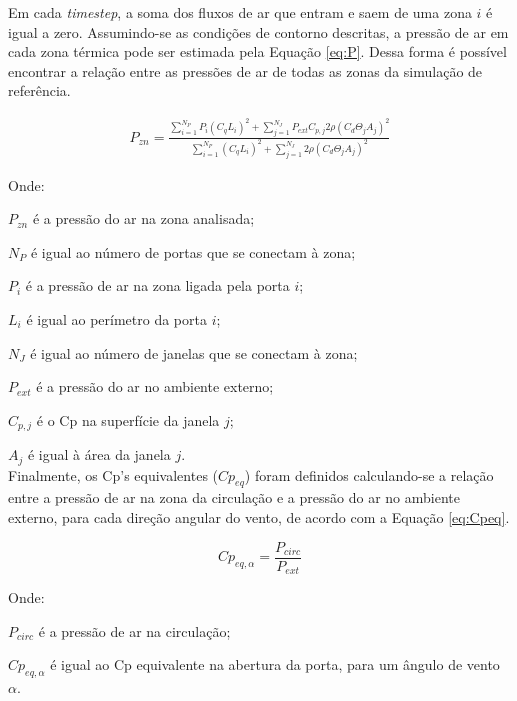 \documentclass[brazil,hardcopy,openany,a5paper]{ufscthesis}
\begin{document}
		Em cada \textit{timestep}, a soma dos fluxos de ar que entram e saem de uma zona $i$ é igual a zero. Assumindo-se as condições de contorno descritas, a pressão de ar em cada zona térmica pode ser estimada pela Equação \ref{eq:P}. Dessa forma é possível encontrar a relação entre as pressões de ar de todas as zonas da simulação de referência.
		
		\begin{equation}\label{eq:P}
		\begin{split}
		P_{zn} = \frac{\sum_{i=1}^{N_P}{P_{i} (C_q L_i)^2} +  %
		\sum_{j=1}^{N_J}{P_{ext} C_{p,j} 2 \rho (C_{d} \Theta_j A_j)^2 }}
		{\sum_{i=1}^{N_P}{(C_q L_i)^2} +  %
			\sum_{j=1}^{N_J}{2 \rho (C_{d} \Theta_j A_j)^2 }}
		\end{split}
		\end{equation}
		
		Onde:
		
		$P_{zn}$ é a pressão do ar na zona analisada;
		
		$N_P$ é igual ao número de portas que se conectam à zona;
		
		$P_i$ é a pressão de ar na zona ligada pela porta $i$;
		
		$L_i$ é igual ao perímetro da porta $i$;
		
		$N_J$ é igual ao número de janelas que se conectam à zona;
		
		$P_{ext}$ é a pressão do ar no ambiente externo;
		
		$C_{p,j}$ é o Cp na superfície da janela $j$;
		
		$A_j$ é igual à área da janela $j$.
		\\
		
		Finalmente, os Cp's equivalentes ($Cp_{eq}$) foram definidos calculando-se a relação entre a pressão de ar na zona da circulação e a pressão do ar no ambiente externo, para cada direção angular do vento, de acordo com a Equação \ref{eq:Cpeq}.
		
		\begin{equation}\label{eq:Cpeq}
		Cp_{eq,\alpha} = \frac{P_{circ}}{P_{ext}}
		\end{equation}
		
		Onde:
		
		$P_{circ}$ é a pressão de ar na circulação;
		
		$Cp_{eq,\alpha}$ é igual ao Cp equivalente na abertura da porta, para um ângulo de vento $\alpha$.
		\\
		
\end{document}
